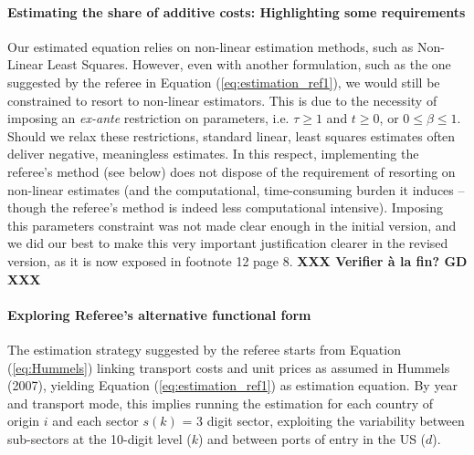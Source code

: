\documentclass[a4paper,11pt]{article}
\begin{document}
\paragraph{Estimating the share of additive costs: Highlighting some requirements} Our estimated equation relies on non-linear estimation methods, such as Non-Linear Least Squares. However, even with another formulation, such as the one suggested by the referee in Equation (\ref{eq:estimation_ref1}), we would still be constrained to resort to non-linear estimators. This is due to the necessity of imposing an \textit{ex-ante} restriction on parameters, i.e. $\tau \geq 1$ and $t \geq 0$, or $0 \leq  \beta \leq 1$. Should we relax these restrictions, standard linear, least squares estimates often deliver negative, meaningless estimates. In this respect, implementing the referee's method (see below) does not dispose of the requirement of resorting on non-linear estimates (and the computational, time-consuming burden it induces -- though the referee’s method is indeed less computational intensive). Imposing this parameters constraint was not made clear enough in the initial version, and we did our best to make this very important justification clearer in the revised version, as it is now exposed in footnote 12 page 8. \textbf{XXX Verifier à la fin? GD XXX }\smallskip



\paragraph{Exploring Referee's alternative functional form \label{subsec:functional_form}}

The estimation strategy suggested by the referee starts from Equation (\ref{eq:Hummels}) linking transport costs and unit prices as assumed in Hummels (2007), yielding Equation (\ref{eq:estimation_ref1}) as estimation equation. By year and transport mode, this implies running the estimation for each country of origin $i$ and each sector $s(k)$ = 3 digit sector, exploiting the variability between sub-sectors at the 10-digit level ($k$) and between ports of entry in the US ($d$).
\end{document}
